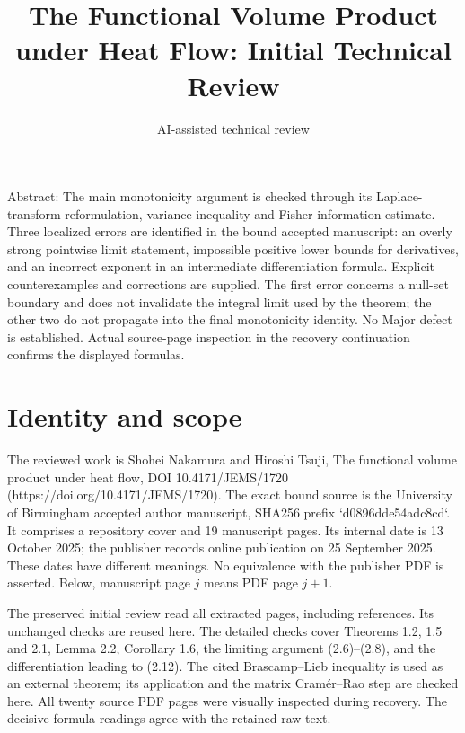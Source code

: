 \documentclass[10pt]{article}
\title{The Functional Volume Product under Heat Flow: Initial Technical Review}
\author{AI-assisted technical review}
\date{}
\begin{document}
\maketitle
Abstract: The main monotonicity argument is checked through its Laplace-transform reformulation, variance inequality and Fisher-information estimate. Three localized errors are identified in the bound accepted manuscript: an overly strong pointwise limit statement, impossible positive lower bounds for derivatives, and an incorrect exponent in an intermediate differentiation formula. Explicit counterexamples and corrections are supplied. The first error concerns a null-set boundary and does not invalidate the integral limit used by the theorem; the other two do not propagate into the final monotonicity identity. No Major defect is established. Actual source-page inspection in the recovery continuation confirms the displayed formulas.\par
\section*{Identity and scope}
The reviewed work is Shohei Nakamura and Hiroshi Tsuji, The functional volume product under heat flow, DOI 10.4171/JEMS/1720 (https://doi.org/10.4171/JEMS/1720). The exact bound source is the University of Birmingham accepted author manuscript, SHA256 prefix `d0896dde54adc8cd`. It comprises a repository cover and 19 manuscript pages. Its internal date is 13 October 2025; the publisher records online publication on 25 September 2025. These dates have different meanings. No equivalence with the publisher PDF is asserted. Below, manuscript page \(j\) means PDF page \(j+1\).\par
The preserved initial review read all extracted pages, including references. Its unchanged checks are reused here. The detailed checks cover Theorems 1.2, 1.5 and 2.1, Lemma 2.2, Corollary 1.6, the limiting argument (2.6)–(2.8), and the differentiation leading to (2.12). The cited Brascamp–Lieb inequality is used as an external theorem; its application and the matrix Cramér–Rao step are checked here. All twenty source PDF pages were visually inspected during recovery. The decisive formula readings agree with the retained raw text.\par
\end{document}
